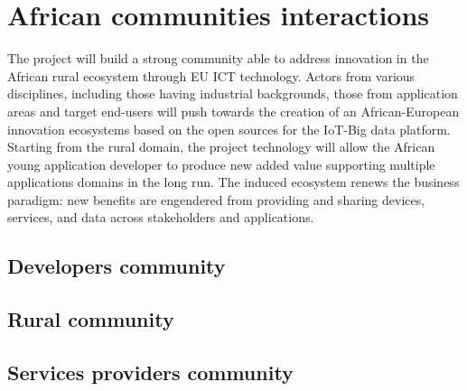 
\section{African communities interactions}

The project will build a strong community able to address innovation in the African rural ecosystem through EU ICT technology.
Actors from various disciplines, including those having industrial backgrounds, those from application areas and target end-users will push towards the creation of an African-European innovation ecosystems based on the open sources for the IoT-Big data platform.
Starting from the rural domain, the project technology will allow the
African young application developer to produce new added value supporting multiple applications domains in the long run.
The induced ecosystem renews the business paradigm: new benefits are engendered from providing and sharing devices, services, and data across stakeholders and applications.

\subsection{Developers community}

\subsection{Rural community}

\subsection{Services providers community}
